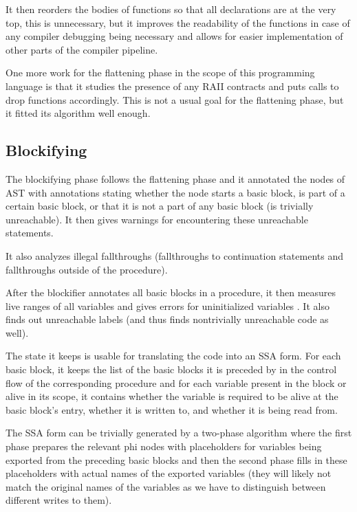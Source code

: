 It then reorders the bodies of functions so that all declarations are at the very top, this is unnecessary, but it improves the readability of the functions in case of any compiler debugging being necessary and allows for easier implementation of other parts of the compiler pipeline.

One more work for the flattening phase in the scope of this programming language is that it studies the presence of any RAII contracts and puts calls to drop functions accordingly. This is not a usual goal for the flattening phase, but it fitted its algorithm well enough.

\subsection{Blockifying}

The blockifying phase follows the flattening phase and it annotated the nodes of AST with annotations stating whether the node starts a basic block, is part of a certain basic block, or that it is not a part of any basic block (is trivially unreachable). It then gives warnings for encountering these unreachable statements.

It also analyzes illegal fallthroughs (fallthroughs to continuation statements and fallthroughs outside of the procedure).



After the blockifier annotates all basic blocks in a procedure, it then measures live ranges of all variables and gives errors for uninitialized variables . It also finds out unreachable labels (and thus finds nontrivially unreachable code as well).

The state it keeps is usable for translating the code into an SSA form. For each basic block, it keeps the list of the basic blocks it is preceded by in the control flow of the corresponding procedure and for each variable present in the block or alive in its scope, it contains whether the variable is required to be alive at the basic block's entry, whether it is written to, and whether it is being read from.

The SSA form can be trivially generated by a two-phase algorithm where the first phase prepares the relevant phi nodes with placeholders for variables being exported from the preceding basic blocks and then the second phase fills in these placeholders with actual names of the exported variables (they will likely not match the original names of the variables as we have to distinguish between different writes to them).

